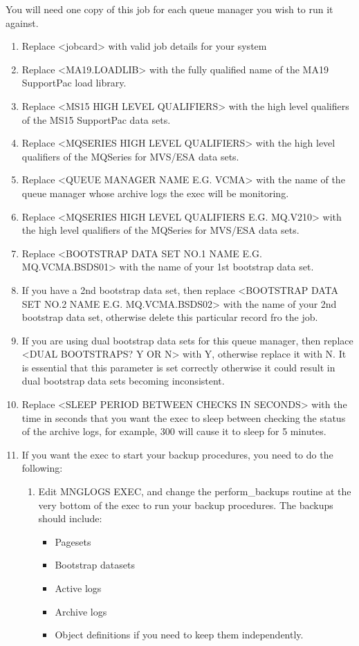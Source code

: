 \documentclass[a4paper,12pt]{report}
\begin{document}
You will need one copy of this job for each queue manager you wish to
run it against.
\begin{enumerate}
\item Replace <jobcard> with valid job details for your system
\item Replace <MA19.LOADLIB> with the fully qualified name of the MA19
SupportPac load library.
\item Replace <MS15 HIGH LEVEL QUALIFIERS> with the high level qualifiers
of the MS15 SupportPac data sets.
\item Replace <MQSERIES HIGH LEVEL QUALIFIERS> with the high level
qualifiers of the MQSeries for MVS/ESA data sets.
\item Replace <QUEUE MANAGER NAME E.G. VCMA> with the name of the queue
manager whose archive logs the exec will be monitoring.
\item Replace <MQSERIES HIGH LEVEL QUALIFIERS E.G. MQ.V210> with the high
level qualifiers of the MQSeries for MVS/ESA data sets.
\item Replace <BOOTSTRAP DATA SET NO.1 NAME E.G. MQ.VCMA.BSDS01> with the
name of your 1st bootstrap data set.
\item If you have a 2nd bootstrap data set, then replace
<BOOTSTRAP DATA SET NO.2 NAME E.G. MQ.VCMA.BSDS02> with the name of
your 2nd bootstrap data set, otherwise delete this particular record fro
the job.
\item If you are using dual bootstrap data sets for this queue manager,
then replace <DUAL BOOTSTRAPS? Y OR N> with Y, otherwise replace it with
N.  It is essential that this parameter is set correctly otherwise it
could result in dual bootstrap data sets becoming inconsistent.
\item Replace <SLEEP PERIOD BETWEEN CHECKS IN SECONDS> with the time in
seconds that you want the exec to sleep between checking the status of
the archive logs, for example, 300 will cause it to sleep for 5 minutes.
\item If you want the exec to start your backup procedures, you need to do
the following:
\begin{enumerate}
\item Edit MNGLOGS EXEC, and change the perform\_backups routine at the
very bottom of the exec to run your backup procedures.  The backups
should include:
\begin{itemize}
\item Pagesets
\item Bootstrap datasets
\item Active logs
\item Archive logs
\item Object definitions if you need to keep them independently.
\end{itemize}


\end{enumerate}
\end{enumerate}
\end{document}
